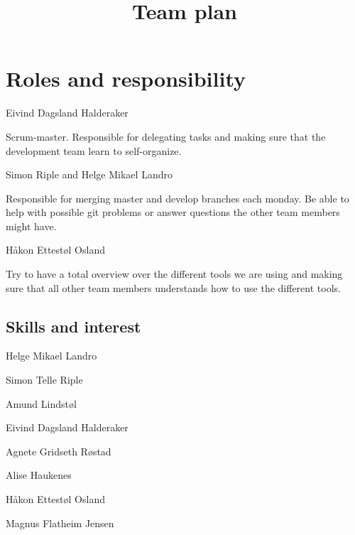 \documentclass{article}
\title{Team plan}
\begin{document}
\date{}
\maketitle
{}

\section*{Roles and responsibility}
\begin{description}[align=right]
\item [Leader:] \hspace{6 mm} Eivind Dagsland Halderaker
\item \hspace*{4 mm} Scrum-master. Responsible for delegating tasks and making sure that the development team learn to self-organize. 
\item [Git repo:] \hspace{6 mm} Simon Riple and Helge Mikael Landro
\item \hspace*{4 mm} Responsible for merging master and develop branches each monday. Be able to help with possible git problems or answer questions the other team members might have.
\item [Tools:] \hspace{6 mm} Håkon Ettestøl Osland
\item \hspace*{4 mm} Try to have a total overview over the different tools we are using and making sure that all other team members understands how to use the different tools.
\end{description}

\subsection*{Skills and interest}
\begin{description}[align=right]
\item [Front end]
\item Helge Mikael Landro
\item Simon Telle Riple
\item Amund Lindstøl
\item [Back end]
\item Eivind Dagsland Halderaker
\item Agnete Gridseth Røstad
\item Alise Haukenes
\item Håkon Ettestøl Osland
\item Magnus Flatheim Jensen
\end{description}
\end{document}
